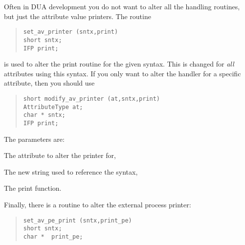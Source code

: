 Often in DUA development you do not want to alter all the handling
routines, but just the attribute value printers.  The routine
\begin{quote}\small\begin{verbatim}
set_av_printer (sntx,print)
short sntx;
IFP print;
\end{verbatim}\end{quote}
is used to alter the print routine for the given syntax.  This is
changed for {\em all} attributes using this syntax.  If you only want
to alter the handler for a specific attribute, then you should use
\begin{quote}\small\begin{verbatim}
short modify_av_printer (at,sntx,print)
AttributeType at;
char * sntx;
IFP print;
\end{verbatim}\end{quote}
The parameters are:
\begin{describe}
\item [\verb"at":] The attribute to alter the printer for,
\item [\verb"sntx":] The new string used to reference the syntax,
\item [\verb"print":] The print function.
\end{describe}

Finally, there is a routine to alter the external process printer:
\begin{quote}\small\begin{verbatim}
set_av_pe_print (sntx,print_pe)
short sntx;
char *  print_pe;
\end{verbatim}\end{quote}
